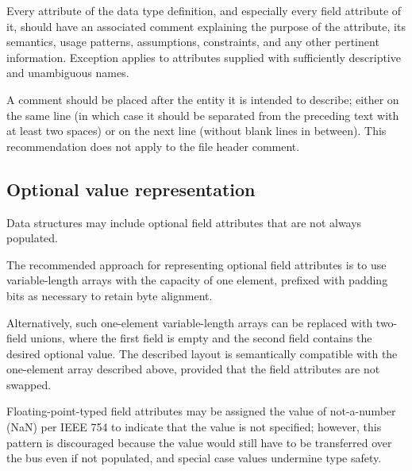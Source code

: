 Every attribute of the data type definition, and especially every field attribute of it,
should have an associated comment explaining the purpose of the attribute, its semantics, usage patterns,
assumptions, constraints, and any other pertinent information.
Exception applies to attributes supplied with sufficiently descriptive and unambiguous names.

A comment should be placed after the entity it is intended to describe;
either on the same line (in which case it should be separated from the preceding text with at least two spaces)
or on the next line (without blank lines in between).
This recommendation does not apply to the file header comment.


\subsection{Optional value representation}

Data structures may include optional field attributes that are not always populated.

The recommended approach for representing optional field attributes
is to use variable-length arrays with the capacity of one element,
prefixed with padding bits as necessary to retain byte alignment.

Alternatively, such one-element variable-length arrays can be replaced with two-field unions,
where the first field is empty and the second field contains the desired optional value.
The described layout is semantically compatible with the one-element array described above,
provided that the field attributes are not swapped.

Floating-point-typed field attributes may be assigned the value of not-a-number (NaN) per IEEE 754
to indicate that the value is not specified;
however, this pattern is discouraged because the value would still have to be transferred over the bus
even if not populated, and special case values undermine type safety.

